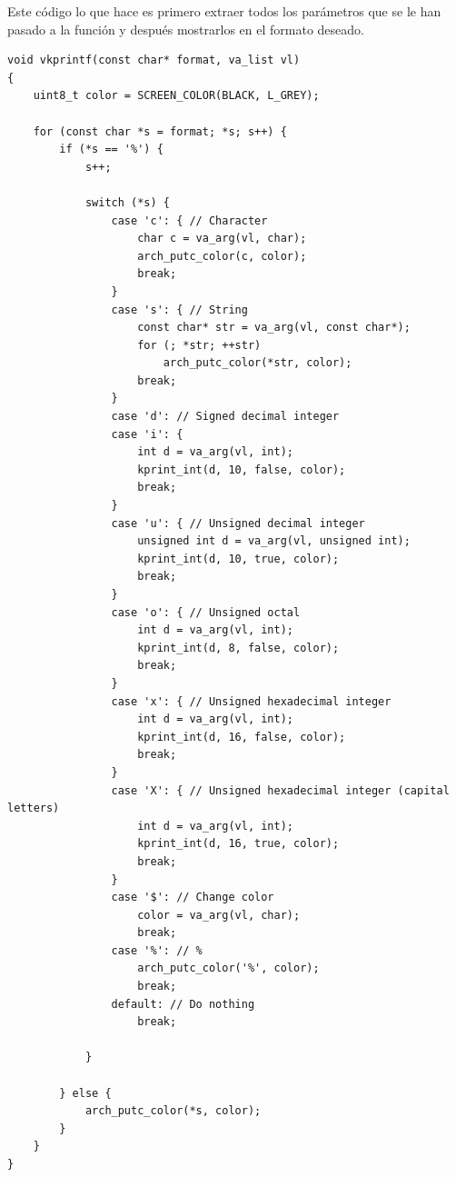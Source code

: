 \documentclass{report}
\begin{document}


Este código lo que hace es primero extraer todos los parámetros que se le han pasado a la función y después mostrarlos en el formato deseado.

\begin{lstlisting}[title=Función que imprime una cadena de caracteres]
void vkprintf(const char* format, va_list vl)
{
    uint8_t color = SCREEN_COLOR(BLACK, L_GREY);

    for (const char *s = format; *s; s++) {
        if (*s == '%') {
            s++;

            switch (*s) {
                case 'c': { // Character
                    char c = va_arg(vl, char);
                    arch_putc_color(c, color);
                    break;
                }
                case 's': { // String
                    const char* str = va_arg(vl, const char*);
                    for (; *str; ++str)
                        arch_putc_color(*str, color);
                    break;
                }
                case 'd': // Signed decimal integer
                case 'i': {
                    int d = va_arg(vl, int);
                    kprint_int(d, 10, false, color);
                    break;
                }
                case 'u': { // Unsigned decimal integer
                    unsigned int d = va_arg(vl, unsigned int);
                    kprint_int(d, 10, true, color);
                    break;
                }
                case 'o': { // Unsigned octal
                    int d = va_arg(vl, int);
                    kprint_int(d, 8, false, color);
                    break;
                }
                case 'x': { // Unsigned hexadecimal integer
                    int d = va_arg(vl, int);
                    kprint_int(d, 16, false, color);
                    break;
                }
                case 'X': { // Unsigned hexadecimal integer (capital letters)
                    int d = va_arg(vl, int);
                    kprint_int(d, 16, true, color);
                    break;
                }
                case '$': // Change color
                    color = va_arg(vl, char);
                    break;
                case '%': // %
                    arch_putc_color('%', color);
                    break;
                default: // Do nothing
                    break;

            }

        } else {
            arch_putc_color(*s, color);
        }
    }
}
\end{lstlisting}
\end{document}
